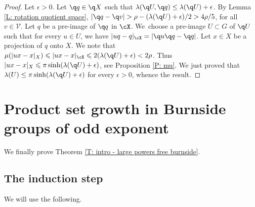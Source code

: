 \begin{proof}
Let $\epsilon > 0$.
Let $\q q \in \q X$ such that $\lambda(\q U, \q q) \leq \lambda(\q U) + \epsilon$.
By Lemma \ref{L: rotation quotient space}, $|\q q - \q v|> \rho - (\lambda(\q U)+\epsilon)/2>4\rho/5$, for all $v \in \mathcal V$.
Let $q$ be a pre-image of $\q q$ in $\cX$.
We~choose a pre-image $U \subset G$ of $\q U$ such that for every $u \in U$, we have $|uq-q|_{\cX}=|\q u \q q -\q q|$.
Let $x\in X$ be a projection of $q$ onto $X$. We note that $\mu (|ux-x|_X)\leqslant |ux-x|_{\cX}\leqslant 2(\lambda(\q U) +\epsilon)<2\rho$.
Thus $|ux-x|_X\leqslant \pi \sinh (\lambda(\q U)+\epsilon)$, see Proposition \ref{P: mu}.
We just proved that $\lambda(U) \leq \pi \sinh (\lambda(\q U)+\epsilon)$ for every $\epsilon > 0$, whence the result.
\end{proof}

\section{Product set growth in Burnside groups of odd exponent}

We finally prove Theorem \ref{T: intro - large powers free burnside}.

\subsection{The induction step}

We will use the following.

